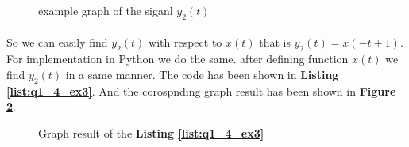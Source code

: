 \begin{figure}[H]
 \centering
{}
\caption{example graph of the siganl $y_2(t)$}
  \label{fig:ex3}
\end{figure}
\paragraph{}
So we can easily find $y_2(t)$ with respect to $x(t)$ 
that is $y_2(t) = x(-t+1)$. For implementation 
in Python we do the same. after defining function 
$x(t)$ we find $y_2(t)$ in a same manner. The code 
has been shown in \textbf{Listing \ref{list:q1_4_ex3}}. And the 
corospnding graph result has been shown in 
\textbf{Figure \ref{fig:Q1-4-ex3}}.

\begin{figure}[H]
  \centering
  \scalebox{0.6}{}
  \caption{Graph result of the \textbf{Listing \ref{list:q1_4_ex3}}}
  \label{fig:Q1-4-ex3}
\end{figure}
